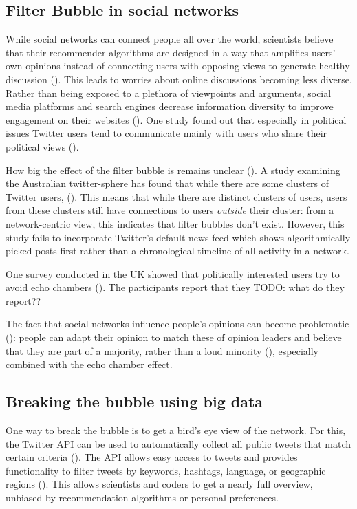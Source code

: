 \subsection{Filter Bubble in social networks}
While social networks can connect people all over the world, scientists believe that their recommender algorithms are designed in a way that amplifies users' own opinions instead of connecting users with opposing views to generate healthy discussion (\cite{pariser2011filter}). This leads to worries about online discussions becoming less diverse. Rather than being exposed to a plethora of viewpoints and arguments, social media platforms and search engines decrease information diversity to improve engagement on their websites (\cite{bozdag2015}). One study found out that especially in political issues Twitter users tend to communicate mainly with users who share their political views (\cite{barbera2015}).

How big the effect of the filter bubble is remains unclear (\cite{bruns2017}). A study examining the Australian twitter-sphere has found that while there are some clusters of Twitter users,  (\cite[9]{bruns2017}). This means that while there are distinct clusters of users, users from these clusters still have connections to users \emph{outside} their cluster: from a network-centric view, this indicates that filter bubbles don't exist. However, this study fails to incorporate Twitter's default news feed which shows algorithmically picked posts first rather than a chronological timeline of all activity in a network.

One survey conducted in the UK showed that politically interested users try to avoid echo chambers (\cite{dubois2018}). The participants report that they TODO: what do they report??


The fact that social networks influence people's opinions can become problematic (\cite{altafini2012}): people can adapt their opinion to match these of opinion leaders and believe that they are part of a majority, rather than a loud minority (\cite{moscovici1991}), especially combined with the echo chamber effect. 


\subsection{Breaking the bubble using big data}
One way to break the bubble is to get a bird's eye view of the network. For this, the Twitter API can be used to automatically collect all public tweets that match certain criteria (\cite{twitterinc.a}). The API allows easy access to tweets and provides functionality to filter tweets by keywords, hashtags, language, or geographic regions (\cite{bello2017detecting}). This allows scientists and coders to get a nearly full overview, unbiased by recommendation algorithms or personal preferences.

